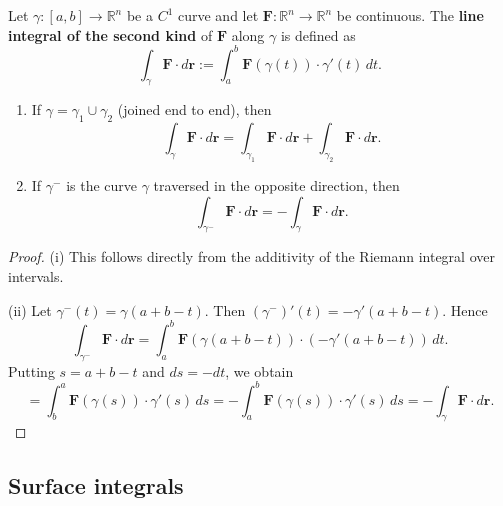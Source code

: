 \begin{definition}\label{def:line_integral_second_kind}
Let $\gamma: [a, b] \to \mathbb{R}^n$ be a $C^1$ curve and let $\mathbf{F}: \mathbb{R}^n \to \mathbb{R}^n$ be continuous. The \textbf{line integral of the second kind} of $\mathbf{F}$ along $\gamma$ is defined as
\[
\int_\gamma \mathbf{F} \cdot d\mathbf{r} := \int_a^b \mathbf{F}(\gamma(t)) \cdot \gamma'(t) \, dt.
\]
\end{definition}

\begin{proposition}\label{prop:line_integral_second_kind_properties}
\begin{enumerate}[label=(\roman*)]
    \item If $\gamma = \gamma_1 \cup \gamma_2$ (joined end to end), then
    \[
    \int_\gamma \mathbf{F} \cdot d\mathbf{r} = \int_{\gamma_1} \mathbf{F} \cdot d\mathbf{r} + \int_{\gamma_2} \mathbf{F} \cdot d\mathbf{r}.
    \]
    \item If $\gamma^-$ is the curve $\gamma$ traversed in the opposite direction, then
    \[
    \int_{\gamma^-} \mathbf{F} \cdot d\mathbf{r} = -\int_\gamma \mathbf{F} \cdot d\mathbf{r}.
    \]
\end{enumerate}
\end{proposition}

\begin{proof}
(i) This follows directly from the additivity of the Riemann integral over intervals.

(ii) Let $\gamma^-(t) = \gamma(a + b - t)$. Then $(\gamma^-)'(t) = -\gamma'(a + b - t)$. Hence
\[
\int_{\gamma^-} \mathbf{F} \cdot d\mathbf{r} = \int_a^b \mathbf{F}(\gamma(a + b - t)) \cdot (-\gamma'(a + b - t)) \, dt.
\]
Putting $s = a + b - t$ and $ds = -dt$, we obtain
\[
= \int_b^a \mathbf{F}(\gamma(s)) \cdot \gamma'(s) \, ds = -\int_a^b \mathbf{F}(\gamma(s)) \cdot \gamma'(s) \, ds = -\int_\gamma \mathbf{F} \cdot d\mathbf{r}.
\]
\end{proof}

\subsection{Surface integrals}

